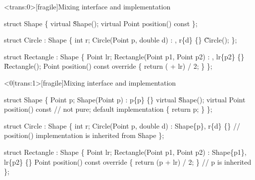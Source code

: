 \begin{frame}<trans:0>[fragile]{Mixing interface and implementation}

  \begin{codeblock}
struct Shape \{
  virtual \~Shape();
  virtual Point position() const 
\};

struct Circle : Shape \{
  int r;
  Circle(Point p, double d) : , r\{d\} \{\}
  \~Circle();
\};

struct Rectangle : Shape \{
  Point lr;
  Rectangle(Point p1, Point p2) : , lr\{p2\} \{\}
  \~Rectangle();
  Point position() const override \{ return ( + lr) / 2; \}
\};\end{codeblock}


\end{frame}

\begin{frame}<0|trans:1>[fragile]{Mixing interface and implementation}

  \begin{codeblock}{
struct Shape \{
  \alert{Point p;}
  Shape(Point p) : p\{p\} \{\}
  virtual \~Shape();
  virtual Point position() const // \alert{not pure; default implementation}
  \{ return p; \} 
\};

struct Circle : Shape \{
  int r;
  Circle(Point p, double d) : \alert{Shape\{p\}}, r\{d\} \{\}
  // position() implementation is inherited from Shape
\};

struct Rectangle : Shape \{
  Point lr;
  Rectangle(Point p1, Point p2) : \alert{Shape\{p1\}}, lr\{p2\} \{\}
  Point position() const override \{ return (\alert{p} + lr) / 2; \} // \alert{p is inherited}
\};
}\end{codeblock}


\end{frame}

